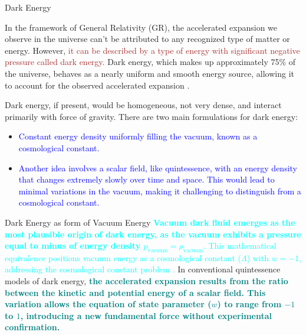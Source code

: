 \documentclass[aspectratio=169,xcolor=dvipsnames, t]{beamer}
\begin{document}
\begin{frame}{Dark Energy}
   
In the framework of General Relativity (GR), the accelerated expansion we observe in the universe can't be attributed to any recognized type of matter or energy. However, \textcolor{brown}{it can be described by a type of energy with significant negative pressure called dark energy.} Dark energy, which makes up approximately 75\% of the universe, behaves as a nearly uniform and smooth energy source, allowing it to account for the observed accelerated expansion \cite{Frieman_2008}.

Dark energy, if present, would be homogeneous, not very dense, and interact primarily with force of gravity. There are two main formulations for dark energy:

\begin{itemize}
    \item \textcolor{blue}{Constant energy density uniformly filling the vacuum, known as a cosmological constant.}
    \item \textcolor{blue}{Another idea involves a scalar field, like quintessence, with an energy density that changes extremely slowly over time and space. This would lead to minimal variations in the vacuum, making it challenging to distinguish from a cosmological constant.}
\end{itemize}

\end{frame}
\begin{frame}{Dark Energy as form of Vacuum Energy}
    \textcolor{cyan}{\textbf{Vacuum dark fluid emerges as the most plausible origin of dark energy, as the vacuum exhibits a pressure equal to minus of energy density $p_{\text{vacuum}}=\rho_{\text{vacuum}}$}. This mathematical equivalence positions vacuum energy as a cosmological constant ($\Lambda$) with $w = -1$, addressing the cosmological constant problem \cite{Frieman_Turner_Huterer_2008,Saha_2006}. }
In conventional quintessence models of dark energy, \textcolor{teal}{\textbf{the accelerated expansion results from the ratio between the kinetic and potential energy of a scalar field. This variation allows the equation of state parameter ($w$) to range from $-1$ to $1$, introducing a new fundamental force without experimental confirmation.}}
\end{frame}
\end{document}
